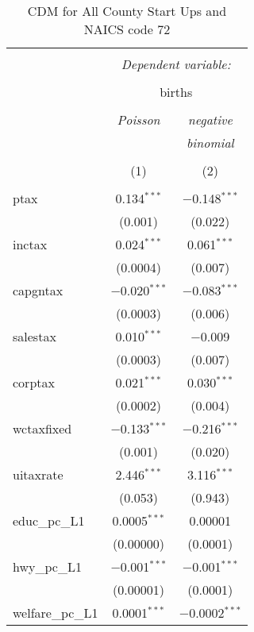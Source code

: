 
\begin{table}[!htbp] \centering 
  \caption{CDM for All County Start Ups and NAICS code 72} 
  \label{} 
\begin{tabular}{@{\extracolsep{5pt}}lcc} 
\\[-1.8ex]\hline 
\hline \\[-1.8ex] 
 & \multicolumn{2}{c}{\textit{Dependent variable:}} \\ 
\cline{2-3} 
\\[-1.8ex] & \multicolumn{2}{c}{births} \\ 
\\[-1.8ex] & \textit{Poisson} & \textit{negative} \\ 
 & \textit{} & \textit{binomial} \\ 
\\[-1.8ex] & (1) & (2)\\ 
\hline \\[-1.8ex] 
 ptax & 0.134$^{***}$ & $-$0.148$^{***}$ \\ 
  & (0.001) & (0.022) \\ 
  inctax & 0.024$^{***}$ & 0.061$^{***}$ \\ 
  & (0.0004) & (0.007) \\ 
  capgntax & $-$0.020$^{***}$ & $-$0.083$^{***}$ \\ 
  & (0.0003) & (0.006) \\ 
  salestax & 0.010$^{***}$ & $-$0.009 \\ 
  & (0.0003) & (0.007) \\ 
  corptax & 0.021$^{***}$ & 0.030$^{***}$ \\ 
  & (0.0002) & (0.004) \\ 
  wctaxfixed & $-$0.133$^{***}$ & $-$0.216$^{***}$ \\ 
  & (0.001) & (0.020) \\ 
  uitaxrate & 2.446$^{***}$ & 3.116$^{***}$ \\ 
  & (0.053) & (0.943) \\ 
  educ\_pc\_L1 & 0.0005$^{***}$ & 0.00001 \\ 
  & (0.00000) & (0.0001) \\ 
  hwy\_pc\_L1 & $-$0.001$^{***}$ & $-$0.001$^{***}$ \\ 
  & (0.00001) & (0.0001) \\ 
  welfare\_pc\_L1 & 0.0001$^{***}$ & $-$0.0002$^{***}$ \\ 

\end{tabular}
\end{table}
